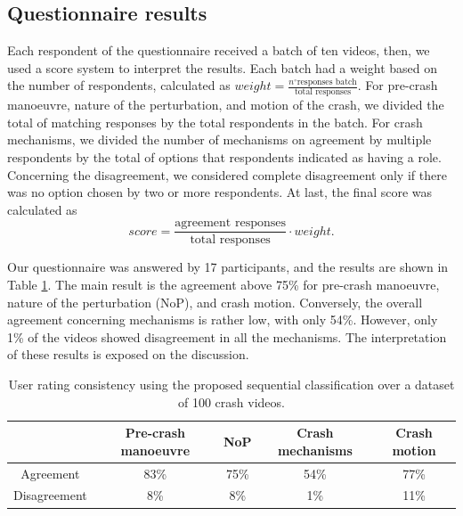 \documentclass{article}
\begin{document}
\subsection{Questionnaire results}
%
Each respondent of the questionnaire received a batch of ten videos, then, we used a score system to interpret the results.
%
Each batch had a weight based on the number of respondents, calculated as $weight = \frac{n^{\circ} \textrm{responses batch}}{\textrm{total responses}}$.
%
For pre-crash manoeuvre, nature of the perturbation, and motion of the crash, we divided the total of matching responses by the total respondents in the batch.
%
For crash mechanisms, we divided the number of mechanisms on agreement by multiple respondents by the total of options that respondents indicated as having a role.
%
Concerning the disagreement, we considered complete disagreement only if there was no option chosen by two or more respondents.
%
At last, the final score was calculated as
%
\begin{equation}
    score = \frac{\textrm{agreement responses}}{\textrm{total responses}} \cdot weight.
\end{equation}


Our questionnaire was answered by 17 participants, and the results are shown in Table \ref{tab: questionnaire}.
%
The main result is the agreement above 75\% for pre-crash manoeuvre, nature of the perturbation (NoP), and crash motion.
%
Conversely, the overall agreement concerning mechanisms is rather low, with only 54\%.
%
However, only 1\% of the videos showed disagreement in all the mechanisms.
%
The interpretation of these results is exposed on the discussion.
%
\begin{table}[!h]
    \centering
    \begin{tabular}{ c | c | c | c | c }
    \toprule
                        & \textbf{Pre-crash manoeuvre} & \textbf{NoP}    & \textbf{Crash mechanisms}    & \textbf{Crash motion} \\
    \midrule
        Agreement       & 83\%      & 75\%          & 54\%          & 77\%  \\
        Disagreement    & 8\%       & 8\%           & 1\%           & 11\%  \\
    \bottomrule
    \end{tabular}
    \caption{User rating consistency using the proposed sequential classification over a dataset of 100 crash videos.}
    \label{tab: questionnaire}
\end{table}
%
\end{document}

